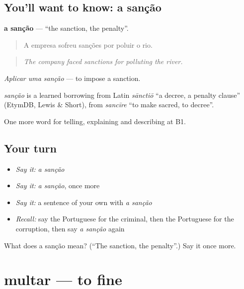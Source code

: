 \subsection*{You'll want to know: a sanção}
\textbf{a sanção} — \textquotedblleft{}the sanction, the penalty\textquotedblright{}.

\begin{quote}
A empresa sofreu sanções por poluir o rio.
\end{quote}

\begin{quote}
\emph{The company faced sanctions for polluting the river.}
\end{quote}

\emph{Aplicar uma sanção} — to impose a sanction.

\begin{cousinweb}
\emph{sanção} is a learned borrowing from Latin \emph{sānctiō} \textquotedblleft{}a decree, a penalty clause\textquotedblright{} (EtymDB, Lewis \& Short), from \emph{sancīre} \textquotedblleft{}to make sacred, to decree\textquotedblright{}.
\end{cousinweb}

\begin{grammarlens}[title={What you've built}]
One more word for telling, explaining and describing at B1.
\end{grammarlens}

\subsection*{Your turn}
\begin{itemize}
\raggedright
  \item \emph{Say it:} \emph{a sanção}
  \item \emph{Say it:} \emph{a sanção}, once more
  \item \emph{Say it:} a sentence of your own with \emph{a sanção}
  \item \emph{Recall:} say the Portuguese for the criminal, then the Portuguese for the corruption, then say \emph{a sanção} again
\end{itemize}

\begin{tcolorbox}[breakable,colback=teal!4,colframe=teal!35!black,title={Before you move on}]
What does a sanção mean? (\textquotedblleft{}The sanction, the penalty\textquotedblright{}.) Say it once more.
\end{tcolorbox}
\section[multar]{multar — to fine}

